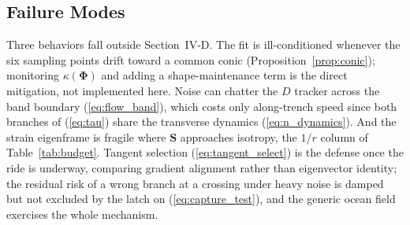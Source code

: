 \subsection{Failure Modes}
\label{sec:failure_modes}

Three behaviors fall outside Section~\mbox{IV-D}. The fit is
ill-conditioned whenever the six sampling points drift toward a common
conic (Proposition~\ref{prop:conic}); monitoring
$\kappa(\boldsymbol{\Phi})$ and adding a shape-maintenance term is the
direct mitigation, not implemented here. Noise can chatter the $D$
tracker across
the band boundary (\ref{eq:flow_band}), which costs only along-trench
speed since both branches of (\ref{eq:tau}) share the transverse
dynamics (\ref{eq:n_dynamics}). And the strain eigenframe is fragile
where $\mathbf{S}$ approaches isotropy, the $1/r$ column of
Table~\ref{tab:budget}. Tangent selection (\ref{eq:tangent_select}) is
the defense once the ride is underway, comparing gradient alignment
rather than eigenvector identity; the residual risk of a wrong branch at
a crossing under heavy noise is damped but not excluded by the latch on
(\ref{eq:capture_test}), and the generic ocean field exercises the whole
mechanism.
